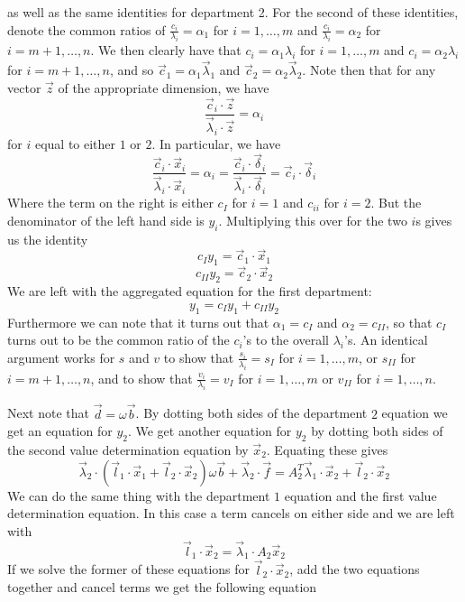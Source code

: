 as well as the same identities for department 2. For the second of these identities, denote the common ratios of $\frac{c_i}{\lambda_i} = \alpha_1$ for $i=1,\ldots,m$ and $\frac{c_i}{\lambda_i} = \alpha_2$ for $i=m+1,\ldots,n$. We then clearly have that $c_i=\alpha_1 \lambda_i$ for $i=1,\ldots,m$ and $c_i=\alpha_2 \lambda_i$ for $i=m+1,\ldots,n$, and so $\vec{c}_1 = \alpha_1 \vec{\lambda}_1$ and $\vec{c}_2 = \alpha_2 \vec{\lambda}_2$. Note then that for any vector $\vec{z}$ of the appropriate dimension, we have
\[ \frac{\vec{c}_i \cdot \vec{z}}{\vec{\lambda}_i \cdot \vec{z}} = \alpha_i \] 
for $i$ equal to either $1$ or $2$. In particular, we have
\[ \frac{\vec{c}_i \cdot \vec{x}_i}{\vec{\lambda}_i \cdot \vec{x}_i} = \alpha_i = \frac{\vec{c}_i \cdot \vec{\delta}_i}{\vec{\lambda}_i \cdot \vec{\delta}_i} = \vec{c}_i \cdot \vec{\delta}_i \]
Where the term on the right is either $c_I$ for $i=1$ and $c_{ii}$ for $i=2$. But the denominator of the left hand side is $y_i$. Multiplying this over for the two $i$s gives us the identity
\[ c_Iy_1 = \vec{c}_1 \cdot \vec{x}_1 \]
\[ c_{II} y_2 = \vec{c}_2 \cdot \vec{x}_2 \]
We are left with the aggregated equation for the first department:
\begin{equation}
	y_1 = c_I y_1 + c_{II}y_2
\end{equation}
Furthermore we can note that it turns out that $\alpha_1 = c_I$ and $\alpha_2 = c_{II}$, so that $c_I$ turns out to be the common ratio of the $c_i$'s to the overall $\lambda_i$'s. An identical argument works for $s$ and $v$ to show that $\frac{s_i}{\lambda_i}=s_I$ for $i=1,\ldots,m$, or $s_{II}$ for $i=m+1,\ldots,n$, and to show that $\frac{v_i}{\lambda_i}=v_I$ for $i=1,\ldots,m$ or $v_{II}$ for $i=1,\ldots,n$. \par 
Next note that $\vec{d} = \omega \vec{b}$. By dotting both sides of the department $2$ equation we get an equation for $y_2$. We get another equation for $y_2$ by dotting both sides of the second value determination equation by $\vec{x}_2$. Equating these gives
\[ \vec{\lambda}_2 \cdot (\vec{l}_1 \cdot \vec{x}_1 + \vec{l}_2 \cdot \vec{x}_2)\omega\vec{b} + \vec{\lambda}_2 \cdot \vec{f} = A_2^T \vec{\lambda}_1 \cdot \vec{x}_2 + \vec{l}_2 \cdot \vec{x}_2 \]
We can do the same thing with the department $1$ equation and the first value determination equation. In this case a term cancels on either side and we are left with 
\[ \vec{l}_1 \cdot \vec{x}_2 = \vec{\lambda}_1 \cdot A_2 \vec{x}_2 \]
If we solve the former of these equations for $\vec{l}_2 \cdot \vec{x}_2$, add the two equations together and cancel terms we get the following equation
